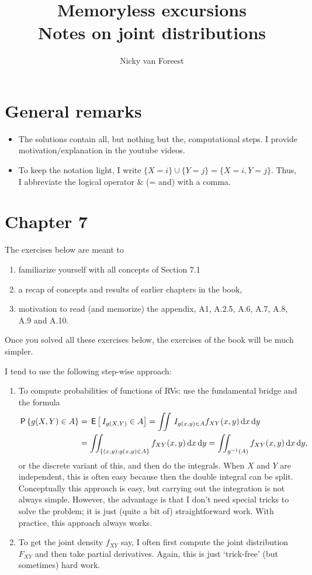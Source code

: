 \documentclass[a4paper,12pt]{article}
\title{Memoryless excursions\\
Notes on joint distributions }
\author{Nicky van Foreest}
\begin{document}
\maketitle
\tableofcontents


\section{General remarks}
\begin{itemize}
\item The solutions contain all, but nothing but the, computational steps.
  I provide motivation/explanation in the youtube videos.
\item To keep the notation light, I write $\{X=i\}\cup \{Y=j\} = \{X=i, Y=j\}$. Thus, I abbreviate the logical operator $\&$ (= and) with a comma.
\end{itemize}

\section{Chapter 7}
\label{sec:chapter-7}


The exercises below are meant to
\begin{enumerate}
\item  familiarize yourself with all concepts of Section 7.1
\item  a recap of concepts and results of  earlier chapters in the book,
\item  motivation to read (and memorize) the appendix, A1, A.2.5, A.6, A.7, A.8, A.9 and A.10.
\end{enumerate}
Once you solved all these exercises below, the  exercises of the book will be much simpler.


I tend to use the following step-wise approach:
\begin{enumerate}
\item To compute probabilities of functions of RVs: use the fundamental bridge and the formula
\begin{align*}
\,\mathsf{P}\left\{g(X, Y) \in A\right\} 
&= \,\mathsf{E}\left[\,I_{g(X,Y)}\in A\right] 
= \iint \,I_{g(x,y) \in A} f_{XY}(x,y) \,\textrm{d}x \,\textrm{d}y \\
&= \iint_{\{(x,y): g(x,y) \in A\}} f_{XY}(x,y) \,\textrm{d}x \,\textrm{d}y 
= \iint_{g^{-1}(A)} f_{XY}(x, y) \,\textrm{d}x \,\textrm{d}y,
\end{align*} 
or the discrete variant of this, and then do the integrals.
When $X$ and $Y$ are independent, this is often easy because then the double integral can be split.
Conceptually this approach is easy, but carrying out the integration is not always simple.
However, the advantage is that I don't need special tricks to solve the problem; it is just (quite a bit of) straightforward work.
With practice, this approach always works.
\item To get the joint density $f_{XY}$ say, I often first compute the joint distribution $F_{XY}$ and then take partial derivatives. Again, this is just `trick-free' (but sometimes) hard work. 
\end{enumerate}
\end{document}

